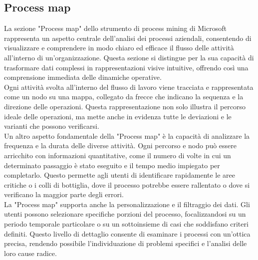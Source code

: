 \documentclass{article}
\begin{document}
\subsection{Process map}
La sezione "Process map" dello strumento di process mining di Microsoft rappresenta un aspetto centrale dell'analisi dei processi aziendali, consentendo di visualizzare e comprendere in modo chiaro ed efficace il flusso delle attività all'interno di un'organizzazione. Questa sezione si distingue per la sua capacità di trasformare dati complessi in rappresentazioni visive intuitive, offrendo così una comprensione immediata delle dinamiche operative.\\
Ogni attività svolta all'interno del flusso di lavoro viene tracciata e rappresentata come un nodo su una mappa, collegato da frecce che indicano la sequenza e la direzione delle operazioni. Questa rappresentazione non solo illustra il percorso ideale delle operazioni, ma mette anche in evidenza tutte le deviazioni e le varianti che possono verificarsi.\\
Un altro aspetto fondamentale della "Process map" è la capacità di analizzare la frequenza e la durata delle diverse attività. Ogni percorso e nodo può essere arricchito con informazioni quantitative, come il numero di volte in cui un determinato passaggio è stato eseguito e il tempo medio impiegato per completarlo. Questo permette agli utenti di identificare rapidamente le aree critiche o i colli di bottiglia, dove il processo potrebbe essere rallentato o dove si verificano la maggior parte degli errori.\\
La "Process map" supporta anche la personalizzazione e il filtraggio dei dati. Gli utenti possono selezionare specifiche porzioni del processo, focalizzandosi su un periodo temporale particolare o su un sottoinsieme di casi che soddisfano criteri definiti. Questo livello di dettaglio consente di esaminare i processi con un'ottica precisa, rendendo possibile l’individuazione di problemi specifici e l’analisi delle loro cause radice.
\end{document}
